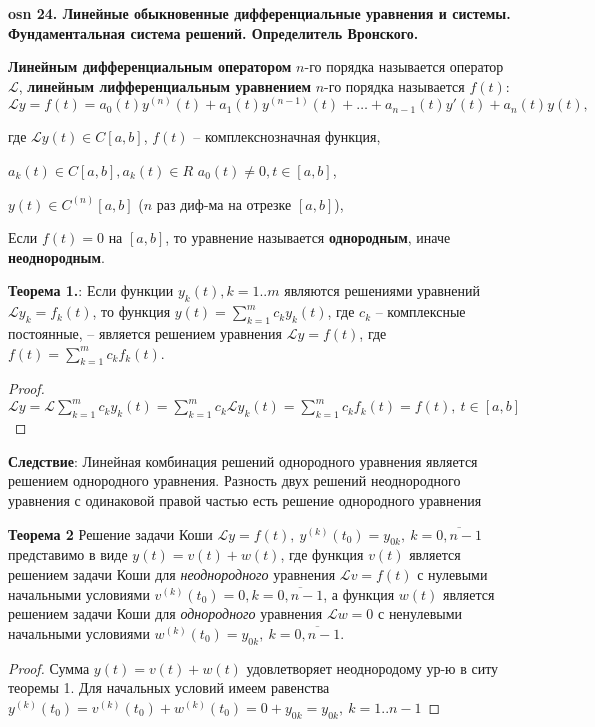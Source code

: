 \textbf{\LARGE osn 24. Линейные обыкновенные дифференциальные уравнения и системы. Фундаментальная система решений. Определитель Вронского.}



\textbf{Линейным дифференциальным оператором} $n$-го порядка называется оператор $\mathcal{L}$, \textbf{линейным лифференциальным уравнением}  $n$-го порядка называется $f(t)$:
$$\mathcal{L} y = f(t) = a_0(t)y^{(n)}(t) + a_1(t)y^{(n-1)}(t) +\dots + a_{n-1}(t)y'(t) + a_n(t)y(t),$$

где $\mathcal{L}y(t) \in C[a, b]$, $f(t)$ -- комплекснозначная функция, 

$a_k(t) \in C[a,b], a_k(t) \in R$ $a_0(t) \neq 0, t \in [a,b]$,

$y(t) \in C^{(n)}[a,b]$ ($n$ раз диф-ма на отрезке $[a,b]$), 


Если $f(t) = 0$ на $[a, b]$, то уравнение называется \textbf{однородным}, иначе \textbf{неоднородным}.

\textbf{Теорема 1.}:
Если функции $y_k(t), k=1..m$ являются решениями уравнений $\mathcal{L} y_k = f_k(t)$, то функция $y(t) = \sum_{k=1}^m c_k y_k(t)$, где $c_k$ -- комплексные постоянные, -- является решением уравнения  $\mathcal{L} y = f(t)$, где $f(t) =  \sum_{k=1}^m c_k f_k(t)$.

\begin{proof}
$\mathcal{L} y = \mathcal{L} \sum_{k=1}^m c_k y_k(t) = \sum_{k=1}^m c_k \mathcal{L} y_k(t) = \sum_{k=1}^m c_k f_k(t) = f(t), \ t \in [a,b]$
\end{proof}

\textbf{Следствие}: Линейная комбинация решений однородного уравнения является решением однородного уравнения. Разность двух решений неоднородного уравнения с одинаковой правой частью есть решение однородного уравнения

\textbf{Теорема 2} Решение задачи Коши $\mathcal{L}y = f(t),~y^{(k)}(t_0) = y_{0k},~k = \overline{0, n - 1}$ представимо в виде $y(t) = v(t) + w(t)$, где функция $v(t)$ является решением задачи Коши для \textit{неоднородного} уравнения $\mathcal{L}v = f(t)$ с нулевыми начальными условиями $v^{(k)}(t_0) = 0, k = \overline{0, n - 1}$, а функция $w(t)$ является решением задачи Коши для \textit{однородного} уравнения $\mathcal{L}w = 0$ с ненулевыми начальными условиями $w^{(k)}(t_0) = y_{0k},~k = \overline{0, n - 1}$.

\begin{proof}
Сумма $y(t) = v(t) + w(t)$ удовлетворяет неоднородому ур-ю в ситу теоремы 1. Для начальных условий имеем равенства $y^{(k)}(t_0) = v^{(k)}(t_0) + w^{(k)}(t_0) = 0 + y_{0k} = y_{0k}, \ k=1..n-1$
\end{proof}

